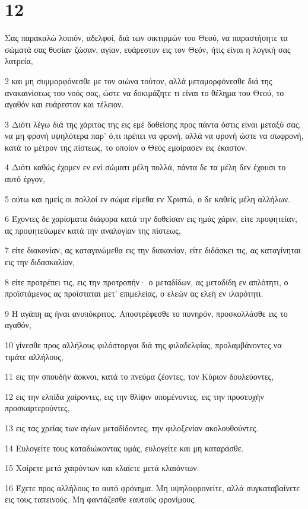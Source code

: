 \chapter{12}

\par Σας παρακαλώ λοιπόν, αδελφοί, διά των οικτιρμών του Θεού, να παραστήσητε τα σώματά σας θυσίαν ζώσαν, αγίαν, ευάρεστον εις τον Θεόν, ήτις είναι η λογική σας λατρεία,
\par 2 και μη συμμορφόνεσθε με τον αιώνα τούτον, αλλά μεταμορφόνεσθε διά της ανακαινίσεως του νοός σας, ώστε να δοκιμάζητε τι είναι το θέλημα του Θεού, το αγαθόν και ευάρεστον και τέλειον.
\par 3 Διότι λέγω διά της χάριτος της εις εμέ δοθείσης προς πάντα όστις είναι μεταξύ σας, να μη φρονή υψηλότερα παρ' ό,τι πρέπει να φρονή, αλλά να φρονή ώστε να σωφρονή, κατά το μέτρον της πίστεως, το οποίον ο Θεός εμοίρασεν εις έκαστον.
\par 4 Διότι καθώς έχομεν εν ενί σώματι μέλη πολλά, πάντα δε τα μέλη δεν έχουσι το αυτό έργον,
\par 5 ούτω και ημείς οι πολλοί εν σώμα είμεθα εν Χριστώ, ο δε καθείς μέλη αλλήλων.
\par 6 Έχοντες δε χαρίσματα διάφορα κατά την δοθείσαν εις ημάς χάριν, είτε προφητείαν, ας προφητεύωμεν κατά την αναλογίαν της πίστεως,
\par 7 είτε διακονίαν, ας καταγινώμεθα εις την διακονίαν, είτε διδάσκει τις, ας καταγίνηται εις την διδασκαλίαν,
\par 8 είτε προτρέπει τις, εις την προτροπήν· ο μεταδίδων, ας μεταδίδη εν απλότητι, ο προϊστάμενος ας προΐσταται μετ' επιμελείας, ο ελεών ας ελεή εν ιλαρότητι.
\par 9 Η αγάπη ας ήναι ανυπόκριτος. Αποστρέφεσθε το πονηρόν, προσκολλάσθε εις το αγαθόν,
\par 10 γίνεσθε προς αλλήλους φιλόστοργοι διά της φιλαδελφίας, προλαμβάνοντες να τιμάτε αλλήλους,
\par 11 εις την σπουδήν άοκνοι, κατά το πνεύμα ζέοντες, τον Κύριον δουλεύοντες,
\par 12 εις την ελπίδα χαίροντες, εις την θλίψιν υπομένοντες, εις την προσευχήν προσκαρτερούντες,
\par 13 εις τας χρείας των αγίων μεταδίδοντες, την φιλοξενίαν ακολουθούντες.
\par 14 Ευλογείτε τους καταδιώκοντας υμάς, ευλογείτε και μη καταράσθε.
\par 15 Χαίρετε μετά χαιρόντων και κλαίετε μετά κλαιόντων.
\par 16 Έχετε προς αλλήλους το αυτό φρόνημα. Μη υψηλοφρονείτε, αλλά συγκαταβαίνετε εις τους ταπεινούς. Μη φαντάζεσθε εαυτούς φρονίμους.
